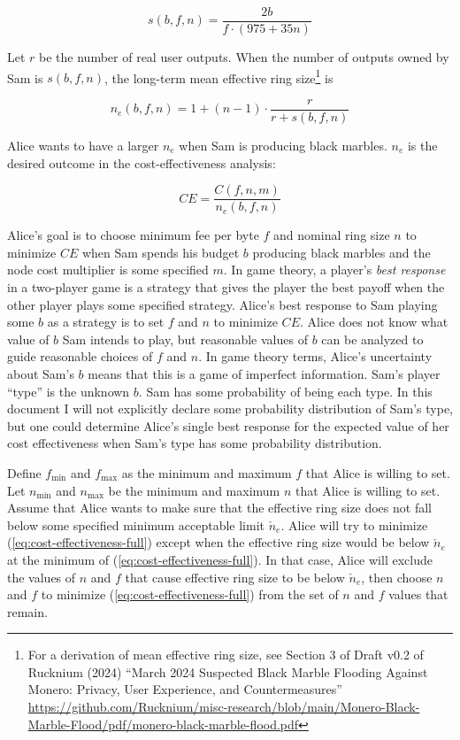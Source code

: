 \documentclass[english]{article}
\begin{document}
\begin{equation}
s\left(b,f,n\right)=\dfrac{2b}{f\cdot\left(975+35n\right)}
\end{equation}

Let $r$ be the number of real user outputs. When the number of outputs
owned by Sam is $s\left(b,f,n\right)$, the long-term mean effective
ring size\footnote{For a derivation of mean effective ring size, see Section 3 of Draft
v0.2 of Rucknium (2024) ``March 2024 Suspected Black Marble Flooding
Against Monero: Privacy, User Experience, and Countermeasures'' \url{https://github.com/Rucknium/misc-research/blob/main/Monero-Black-Marble-Flood/pdf/monero-black-marble-flood.pdf}} is

\begin{equation}
n_{e}\left(b,f,n\right)=1+\left(n-1\right)\cdot\dfrac{r}{r+s\left(b,f,n\right)}\label{eq:expectation-n_e}
\end{equation}

Alice wants to have a larger $n_{e}$ when Sam is producing black
marbles. $n_{e}$ is the desired outcome in the cost-effectiveness
analysis:

\begin{equation}
CE=\dfrac{C\left(f,n,m\right)}{n_{e}\left(b,f,n\right)}\label{eq:cost-effectiveness-full}
\end{equation}

Alice's goal is to choose minimum fee per byte $f$ and nominal ring
size $n$ to minimize $CE$ when Sam spends his budget $b$ producing
black marbles and the node cost multiplier is some specified $m$.
In game theory, a player's \textit{best response} in a two-player
game is a strategy that gives the player the best payoff when the
other player plays some specified strategy. Alice's best response
to Sam playing some $b$ as a strategy is to set $f$ and $n$ to
minimize $CE$. Alice does not know what value of $b$ Sam intends
to play, but reasonable values of $b$ can be analyzed to guide reasonable
choices of $f$ and $n$. In game theory terms, Alice's uncertainty
about Sam's $b$ means that this is a game of imperfect information.
Sam's player ``type'' is the unknown $b$. Sam has some probability
of being each type. In this document I will not explicitly declare
some probability distribution of Sam's type, but one could determine
Alice's single best response for the expected value of her cost effectiveness
when Sam's type has some probability distribution.

Define $f_{\min}$ and $f_{\max}$ as the minimum and maximum $f$
that Alice is willing to set. Let $n_{\min}$ and $n_{\max}$ be the
minimum and maximum $n$ that Alice is willing to set. Assume that
Alice wants to make sure that the effective ring size does not fall
below some specified minimum acceptable limit $\check{n}_{e}$. Alice
will try to minimize (\ref{eq:cost-effectiveness-full}) except when
the effective ring size would be below $\check{n}_{e}$ at the minimum
of (\ref{eq:cost-effectiveness-full}). In that case, Alice will exclude
the values of $n$ and $f$ that cause effective ring size to be below
$\check{n}_{e}$, then choose $n$ and $f$ to minimize (\ref{eq:cost-effectiveness-full})
from the set of $n$ and $f$ values that remain.
\end{document}
